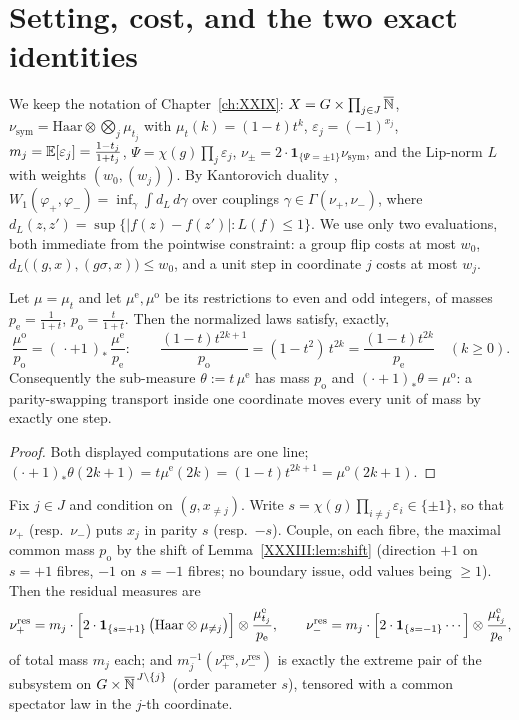\section{Setting, cost, and the two exact identities}\label{XXXIII:sec:setting}

We keep the notation of Chapter~\ref{ch:XXIX}: $X=G\times\prod_{j\in J}\overline{\mathbb{N}}$,
$\nu_{\mathrm{sym}}=\mathrm{Haar}\otimes\bigotimes_j\mu_{t_j}$ with $\mu_t(k)=(1-t)t^k$,
$\varepsilon_j=(-1)^{x_j}$, $m_j=\mathbb{E}[\varepsilon_j]=\frac{1-t_j}{1+t_j}$,
$\Psi=\chi(g)\prod_j\varepsilon_j$, $\nu_\pm=2\cdot\mathbf1_{\{\Psi=\pm1\}}
\nu_{\mathrm{sym}}$, and the Lip-norm $L$ with weights $(w_0,(w_j))$. By Kantorovich
duality \cite{Villani}, $W_1(\varphi_+,\varphi_-)=\inf_\gamma\int d_L\,d\gamma$ over couplings
$\gamma\in\Gamma(\nu_+,\nu_-)$, where $d_L(z,z')=\sup\{|f(z)-f(z')|:L(f)\le1\}$. We use
only two evaluations, both immediate from the pointwise constraint: a group flip costs at
most $w_0$, $d_L\bigl((g,x),(g\sigma,x)\bigr)\le w_0$, and a unit step in coordinate $j$
costs at most $w_j$.

\begin{lemma}\label{XXXIII:lem:shift}
Let $\mu=\mu_t$ and let $\mu^{\mathrm e},\mu^{\mathrm o}$ be its restrictions to even and
odd integers, of masses $p_{\mathrm e}=\frac1{1+t}$, $p_{\mathrm o}=\frac t{1+t}$. Then
the normalized laws satisfy, exactly,
\[
\frac{\mu^{\mathrm o}}{p_{\mathrm o}}=(\,\cdot+1\,)_*\,\frac{\mu^{\mathrm e}}{p_{\mathrm e}}:
\qquad
\frac{(1-t)t^{2k+1}}{p_{\mathrm o}}=(1-t^2)\,t^{2k}
=\frac{(1-t)t^{2k}}{p_{\mathrm e}}\quad(k\ge0).
\]
Consequently the sub-measure $\theta:=t\,\mu^{\mathrm e}$ has mass $p_{\mathrm o}$ and
$(\cdot+1)_*\theta=\mu^{\mathrm o}$: a parity-swapping transport inside one coordinate
moves every unit of mass by exactly one step.
\end{lemma}

\begin{proof}
Both displayed computations are one line; $(\cdot+1)_*\theta(2k+1)=t\mu^{\mathrm
e}(2k)=(1-t)t^{2k+1}=\mu^{\mathrm o}(2k+1)$.
\end{proof}

\begin{lemma}\label{XXXIII:lem:residual}
Fix $j\in J$ and condition on $(g,x_{\ne j})$. Write $s=\chi(g)\prod_{i\ne
j}\varepsilon_i\in\{\pm1\}$, so that $\nu_+$ (resp.\ $\nu_-$) puts $x_j$ in parity $s$
(resp.\ $-s$). Couple, on each fibre, the maximal common mass $p_{\mathrm o}$ by the
shift of Lemma~\ref{XXXIII:lem:shift} (direction $+1$ on $s=+1$ fibres, $-1$ on $s=-1$ fibres;
no boundary issue, odd values being $\ge1$). Then the residual measures are
\[
\nu_+^{\mathrm{res}}=m_j\cdot\Bigl[2\cdot\mathbf1_{\{s=+1\}}\,
\bigl(\mathrm{Haar}\otimes\mu_{\ne j}\bigr)\Bigr]\otimes\frac{\mu^{\mathrm e}_{t_j}}
{p_{\mathrm e}},
\qquad
\nu_-^{\mathrm{res}}=m_j\cdot\Bigl[2\cdot\mathbf1_{\{s=-1\}}\cdots\Bigr]\otimes
\frac{\mu^{\mathrm e}_{t_j}}{p_{\mathrm e}},
\]
of total mass $m_j$ each; and $m_j^{-1}(\nu_+^{\mathrm{res}},\nu_-^{\mathrm{res}})$ is
exactly the extreme pair of the subsystem on $G\times\overline{\mathbb{N}}^{\,J\setminus\{j\}}$
(order parameter $s$), tensored with a common spectator law in the $j$-th coordinate.
\end{lemma}

